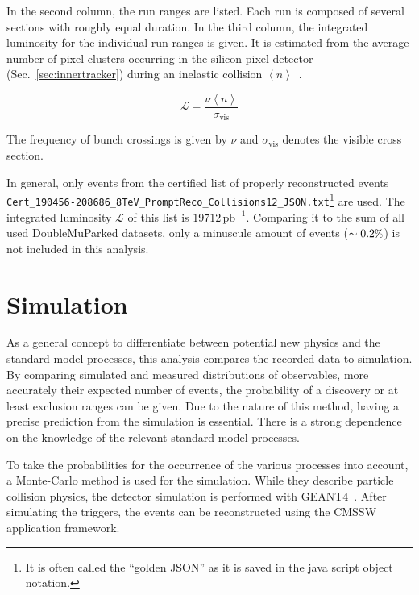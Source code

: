 
In the second column, the run ranges are listed. Each run is composed of several sections with roughly equal duration. In the third column, the integrated luminosity for the individual run ranges is given. It is estimated from the average number of pixel clusters occurring in the silicon pixel detector (Sec.~\ref{sec:innertracker}) during an inelastic collision $\left< n \right>$~\cite{cms-pixel-lumi-13}.

\begin{equation}
  \label{eq:lumi}
  \mathcal{L} = \frac{\nu \left< n \right>}{\sigma_{\text{vis}}}
\end{equation}

\noindent The frequency of bunch crossings is given by $\nu$ and $\sigma_{\text{vis}}$ denotes the visible cross section. 

In general, only events from the certified list of properly reconstructed events \\ \verb+Cert_190456-208686_8TeV_PromptReco_Collisions12_JSON.txt+\footnote{It is often called the ``golden JSON'' as it is saved in the java script object notation.} are used. The integrated luminosity $\mathcal{L}$ of this list is $19712\,\text{pb}^{-1}$. Comparing it to the sum of all used DoubleMuParked datasets, only a minuscule amount of events ($\sim 0.2\pct$) is not included in this analysis.

\section{Simulation}

As a general concept to differentiate between potential new physics and the standard model processes, this analysis compares the recorded data to simulation. By comparing simulated and measured distributions of observables, more accurately their expected number of events, the probability of a discovery or at least exclusion ranges can be given. Due to the nature of this method, having a precise prediction from the simulation is essential. There is a strong dependence on the knowledge of the relevant standard model processes.

To take the probabilities for the occurrence of the various processes into account, a Monte-Carlo method is used for the simulation. While they describe particle collision physics, the detector simulation is performed with \textsc{GEANT4}~\cite{geant41,geant42}. After simulating the triggers, the events can be reconstructed using the \textsc{CMSSW} application framework.


